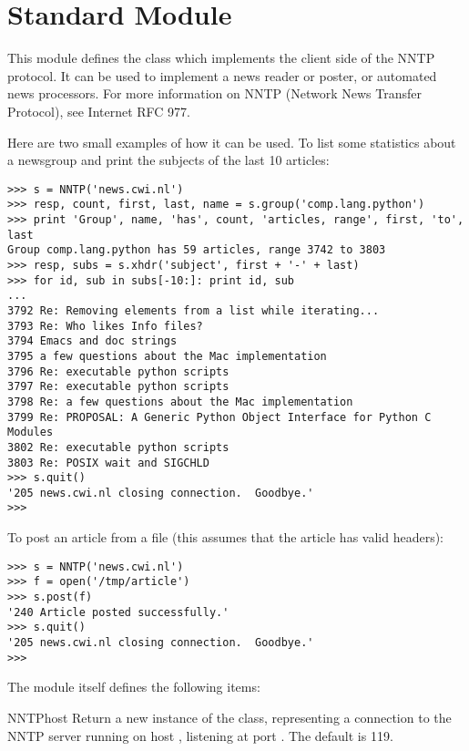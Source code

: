 \section{Standard Module }
\label{module-nntplib}

\renewcommand{\indexsubitem}{(in module nntplib)}

This module defines the class  which implements the client
side of the NNTP protocol.  It can be used to implement a news reader
or poster, or automated news processors.  For more information on NNTP
(Network News Transfer Protocol), see Internet RFC 977.

Here are two small examples of how it can be used.  To list some
statistics about a newsgroup and print the subjects of the last 10
articles:

\bcode\begin{verbatim}
>>> s = NNTP('news.cwi.nl')
>>> resp, count, first, last, name = s.group('comp.lang.python')
>>> print 'Group', name, 'has', count, 'articles, range', first, 'to', last
Group comp.lang.python has 59 articles, range 3742 to 3803
>>> resp, subs = s.xhdr('subject', first + '-' + last)
>>> for id, sub in subs[-10:]: print id, sub
... 
3792 Re: Removing elements from a list while iterating...
3793 Re: Who likes Info files?
3794 Emacs and doc strings
3795 a few questions about the Mac implementation
3796 Re: executable python scripts
3797 Re: executable python scripts
3798 Re: a few questions about the Mac implementation 
3799 Re: PROPOSAL: A Generic Python Object Interface for Python C Modules
3802 Re: executable python scripts 
3803 Re: POSIX wait and SIGCHLD
>>> s.quit()
'205 news.cwi.nl closing connection.  Goodbye.'
>>> 
\end{verbatim}\ecode

To post an article from a file (this assumes that the article has
valid headers):

\bcode\begin{verbatim}
>>> s = NNTP('news.cwi.nl')
>>> f = open('/tmp/article')
>>> s.post(f)
'240 Article posted successfully.'
>>> s.quit()
'205 news.cwi.nl closing connection.  Goodbye.'
>>> 
\end{verbatim}\ecode
%
The module itself defines the following items:

\begin{funcdesc}{NNTP}{host}
Return a new instance of the  class, representing a
connection to the NNTP server running on host , listening at
port .  The default  is 119.
\end{funcdesc}

